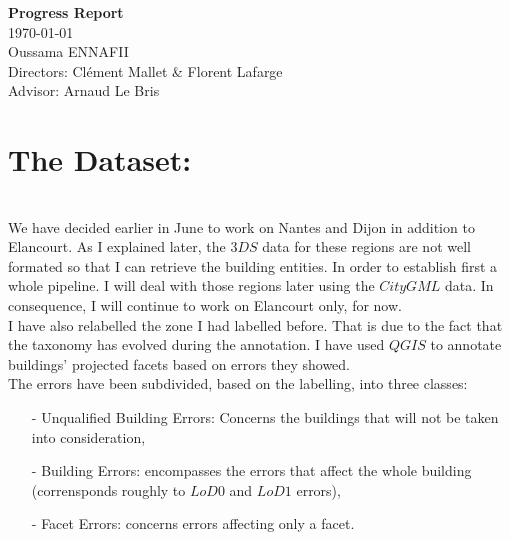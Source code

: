 \documentclass[a4paper, 11pt]{article}
\begin{document}
	\begin{centering}
		\Large{\textbf{Progress Report}}\\
		\large{\today}
~\\
		Oussama ENNAFII\\
		Directors: Cl\'ement Mallet \& Florent Lafarge \\
		Advisor: Arnaud Le Bris \\

	\end{centering}





	\section{The Dataset:}
~\\

	We have decided earlier in June to work on Nantes and Dijon in addition to
	Elancourt. As I explained later, the $3DS$ data for these regions are not
	well formated so that I can retrieve the building entities. In order to
	establish first a whole pipeline. I will deal with those regions later using
	the $CityGML$ data. In consequence, I will continue to work on Elancourt
	only, for now.\\

	I have also relabelled the zone I had labelled before. That is due to the fact
	that the taxonomy has evolved during the annotation. I have used $QGIS$ to
	annotate buildings' projected facets based on errors they showed.\\

	The errors have been subdivided, based on the labelling, into three classes:
	\begin{itemize}
		\item[-] Unqualified Building Errors: Concerns the buildings that will not
		be taken into consideration,
		\item[-] Building Errors: encompasses the errors that affect the whole
		building (corrensponds roughly to $LoD0$ and $LoD1$ errors),
		\item[-] Facet Errors: concerns errors affecting only a facet.
	\end{itemize}
\end{document}
